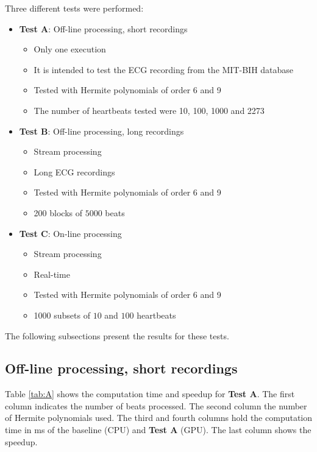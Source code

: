 \documentclass[runningheads]{llncs}
\begin{document}
Three different tests were performed:
\begin{itemize}
\item \textbf{Test A}: Off-line processing, short recordings
	\begin{itemize}
	\item Only one execution
	\item It is intended to test the ECG recording from the MIT-BIH database
	\item Tested with Hermite polynomials of order 6 and 9
	\item The number of heartbeats tested were 10, 100, 1000 and 2273
	\end{itemize}
\item \textbf{Test B}: Off-line processing, long recordings 
	\begin{itemize}
	\item Stream processing
	\item Long ECG recordings
	\item Tested with Hermite polynomials of order 6 and 9
	\item 200 blocks of $5000$ beats
	\end{itemize}
\item \textbf{Test C}: On-line processing
	\begin{itemize}
	\item Stream processing
	\item Real-time
	\item Tested with Hermite polynomials of order 6 and 9
	\item 1000 subsets of $10$ and $100$ heartbeats
	\end{itemize}
\end{itemize}

The following subsections present the results for these tests.

\subsection{Off-line processing, short recordings}\label{ss:offlineshort}
Table \ref{tab:A} shows the computation time and speedup for \textbf{Test A}. The first column indicates the number of beats processed. The second column the number of Hermite polynomials used. The third and fourth columns hold the computation time in ms of the baseline (CPU) and \textbf{Test A} (GPU). The last column shows the speedup. 
\end{document}
